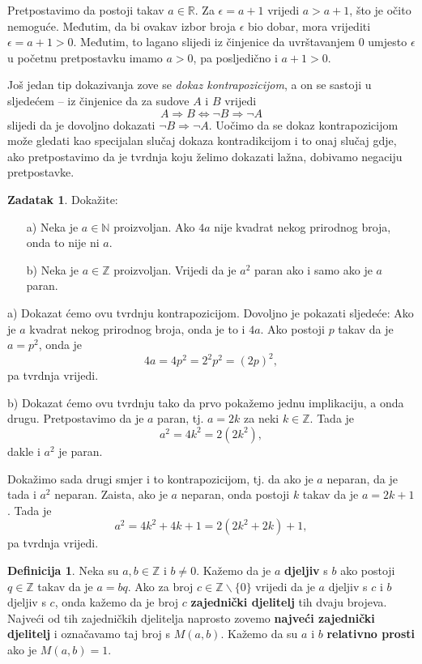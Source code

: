 \documentclass{book}
\renewenvironment{proof}{%
    \vspace{-\parskip}\begin{oldproof}%
    }{%
    \end{oldproof}%
}
\theoremstyle{definition}
\theoremstyle{definition}
\newtheorem{definition}{Definicija}
\newtheorem{exercise}{Zadatak}
\theoremstyle{remark}
\begin{document}
\begin{proof}[Rješenje]
Pretpostavimo da postoji takav $a\in \mathbb{R}$. Za $\epsilon=a+1$ vrijedi $a>a+1$, što je očito nemoguće. Međutim, da bi ovakav izbor broja $\epsilon$ bio dobar, mora vrijediti $\epsilon=a+1>0$. Međutim, to lagano slijedi iz činjenice da uvrštavanjem $0$ umjesto $\epsilon$ u početnu pretpostavku imamo $a>0$, pa posljedično i $a+1>0$.
\end{proof}
Još jedan tip dokazivanja zove se \textit{dokaz kontrapozicijom}, a on se sastoji u sljedećem -- iz činjenice da za sudove $A$ i $B$ vrijedi 
$$A\Rightarrow B\Leftrightarrow \neg B\Rightarrow \neg A$$
slijedi da je dovoljno dokazati $\neg B\Rightarrow \neg A$. Uočimo da se dokaz kontrapozicijom može gledati kao specijalan slučaj dokaza kontradikcijom i to onaj slučaj gdje, ako pretpostavimo da je tvrdnja koju želimo dokazati lažna, dobivamo negaciju pretpostavke.

\begin{exercise}
Dokažite: \begin{itemize}
\item[a)] Neka je $a\in \mathbb{N}$ proizvoljan. Ako $4a$ nije kvadrat nekog prirodnog broja, onda to nije ni $a$.
\item[b)] Neka je $a\in \mathbb{Z}$ proizvoljan. Vrijedi da je $a^2$ paran ako i samo ako je $a$ paran.
\end{itemize}
\end{exercise}
\begin{proof}[Rješenje]
a) Dokazat ćemo ovu tvrdnju kontrapozicijom. Dovoljno je pokazati sljedeće: Ako je $a$ kvadrat nekog prirodnog broja, onda je to i $4a$. Ako postoji $p$ takav da je $a=p^2$, onda je $$4a=4p^2=2^2p^2=(2p)^2,$$ 
pa tvrdnja vrijedi.

b) Dokazat ćemo ovu tvrdnju tako da prvo pokažemo jednu implikaciju, a onda drugu. Pretpostavimo da je $a$ paran, tj. $a=2k$ za neki $k\in \mathbb{Z}$. Tada je $$a^2=4k^2=2(2k^2),$$ dakle i $a^2$ je paran. 

Dokažimo sada drugi smjer i to kontrapozicijom, tj. da ako je $a$ neparan, da je tada i $a^2$ neparan. Zaista, ako je $a$ neparan, onda postoji $k$ takav da je $a=2k+1$. Tada je $$a^2=4k^2+4k+1=2(2k^2+2k)+1,$$ 
pa tvrdnja vrijedi.
\end{proof}
\begin{definition}
Neka su $a, b\in \mathbb{Z}$ i $b\neq 0$. Kažemo da je $a$ \textbf{djeljiv} s $b$ ako postoji $q\in \mathbb{Z}$ takav da je $a=bq$. Ako za broj $c\in \mathbb{Z}\backslash \{0\}$ vrijedi da je $a$ djeljiv s $c$ i $b$ djeljiv s $c$, onda kažemo da je broj $c$ \textbf{zajednički djelitelj} tih dvaju brojeva. Najveći od tih zajedničkih djelitelja naprosto zovemo \textbf{najveći zajednički djelitelj} i označavamo taj broj s $M(a, b)$. Kažemo da su $a$ i $b$ \textbf{relativno prosti} ako je $M(a, b)=1$.
\end{definition}
\end{document}
